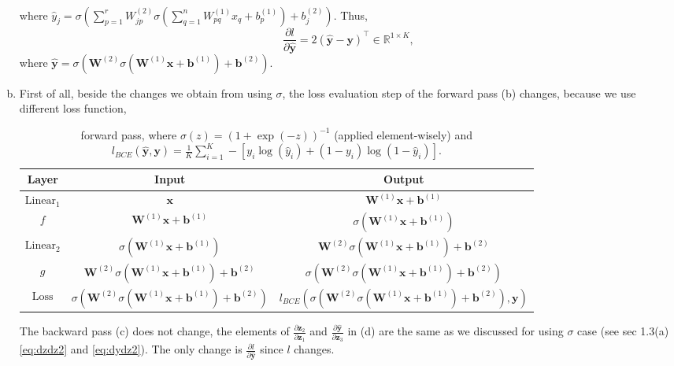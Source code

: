 \documentclass[10pt,a4paper]{article}
\theoremstyle{dotlessP}
\def\RR{\mathbb{R}}
\newcommand{\linear}{\text{Linear}}
\newcommand{\loss}{\text{Loss}}
\newcommand{\dldy}{\frac{\partial l}{\partial \bm{\hat{y}}}}
\newcommand{\dydz}{\frac{\partial \bm{\hat{y}}}{\partial \bm z_3}}
\newcommand{\dzdz}{\frac{\partial \bm z_2}{\partial \bm z_1}}
\newcommand{\yh}{\bm{\hat{y}}}
\begin{document}
\begin{enumerate}[(a)]
\begin{equation}
\begin{aligned}
\end{aligned}
\end{equation}
where $\hat{y}_j = \sigma\left(\sum_{p=1}^{r}W^{(2)}_{jp} \sigma\left( \sum_{q=1}^nW^{(1)}_{pq}x_q+b^{(1)}_p\right)+b^{(2)}_j\right)$.
Thus, 
\begin{equation}
\dldy = 2(\yh -\bm y)^\top 
\in \RR^{1\times K},
\end{equation}
where $\yh = \sigma\left(\bm W^{(2)}\sigma\left(\bm W^{(1)} \bm x+\bm b^{(1)}\right) + \bm b^{(2)}\right)$.
\item First of all, beside the changes we obtain from using $\sigma$,  the loss evaluation step of the forward pass (b) changes, because we use different loss function,
	\begin{table}[tbhp] 
	{\footnotesize
		\caption{ forward pass, where $\sigma(z)=(1+\exp(-z))^{-1}$ (applied element-wisely) and $l_{BCE}(\yh, \bm y)=\frac{1}{K}\sum_{i=1}^{K}-[y_i\log(\hat{y}_i)+(1-y_i)\log(1-\hat{y}_i)]$.
		}\label{tab:fw3}
		\begin{center}
			\renewcommand{\arraystretch}{1.5}
			\begin{tabular}{|c|c|c|}
				\hline 
				Layer & Input  & Output \\ 
				\hline 
				$\linear_1$& $\bm x$ & $\bm W^{(1)} \bm x+\bm b^{(1)}$ \\ 
				\hline 
				$f$	&$\bm W^{(1)} \bm x+\bm b^{(1)}$&  $\sigma\left(\bm W^{(1)} \bm x+\bm b^{(1)}\right)$\\ 
				\hline 
				$\linear_2$& $\sigma\left(\bm W^{(1)} \bm x+\bm b^{(1)}\right)$ & $\bm W^{(2)}\sigma\left(\bm W^{(1)} \bm x+\bm b^{(1)}\right) + \bm b^{(2)}$ \\ 
				\hline 
				$g$	& $\bm W^{(2)}\sigma\left(\bm W^{(1)} \bm x+\bm b^{(1)}\right) + \bm b^{(2)}$ &  $\sigma\left(\bm W^{(2)}\sigma\left(\bm W^{(1)} \bm x+\bm b^{(1)}\right) + \bm b^{(2)}\right)$\\ 
				\hline 
				$\loss$	& $\sigma\left(\bm W^{(2)}\sigma\left(\bm W^{(1)} \bm x+\bm b^{(1)}\right) + \bm b^{(2)}\right)$ & $l_{BCE}(\sigma\left(\bm W^{(2)}\sigma\left(\bm W^{(1)} \bm x+\bm b^{(1)}\right) + \bm b^{(2)}\right), \bm y)$ \\ 
				\hline 
			\end{tabular} 
		\end{center}
	}
\end{table}
The backward pass (c) does not change, the elements of $\dzdz$ and $\dydz$ in (d) are the same as we discussed for using $\sigma$ case (see sec 1.3(a) \eqref{eq:dzdz2} and \eqref{eq:dydz2}). The only change is $\dldy$ since $l$ changes.

\end{enumerate}
\end{document}
